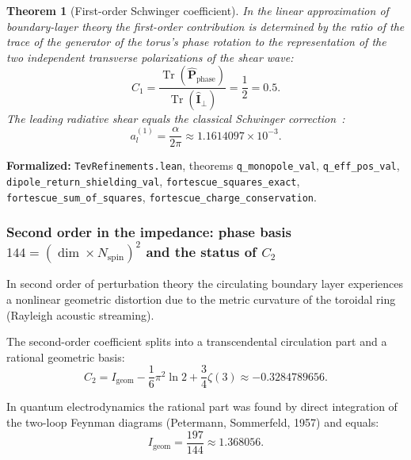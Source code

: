 \documentclass[11pt,a4paper]{article}
\newtheorem{theorem}{Theorem}
\theoremstyle{definition}
\theoremstyle{remark}
\begin{document}
\begin{theorem}[First-order Schwinger coefficient]
\label{thm:schwinger_first_order}
    In the linear approximation of boundary-layer theory the first-order contribution is determined by the ratio of the trace of the generator of the torus's phase rotation to the representation of the two independent transverse polarizations of the shear wave:
\begin{equation}
C_1 = \frac{\operatorname{Tr}(\hat{\mathbf{P}}_{\mathrm{phase}})}{\operatorname{Tr}(\hat{\mathbf{I}}_\perp)} = \frac{1}{2} = 0.5.
\label{eq:schwinger_c1_exact}
\end{equation}
The leading radiative shear equals the classical Schwinger correction~\cite{Schwinger1948}:
\begin{equation}
a_l^{(1)} = \frac{\alpha}{2\pi} \approx 1.1614097 \times 10^{-3}.
\label{eq:schwinger_leading_val}
\end{equation}
\end{theorem}

\noindent\small\textbf{Formalized:} \texttt{TevRefinements.lean}, theorems \texttt{q_monopole_val}, \texttt{q_eff_pos_val}, \texttt{dipole_return_shielding_val}, \texttt{fortescue_squares_exact}, \texttt{fortescue_sum_of_squares}, \texttt{fortescue_charge_conservation}.

\subsubsection{Second order in the impedance: phase basis $144 = (\dim \times N_{\mathrm{spin}})^2$ and the status of $C_2$}

In second order of perturbation theory the circulating boundary layer experiences a nonlinear geometric distortion due to the metric curvature of the toroidal ring (Rayleigh acoustic streaming).

The second-order coefficient splits into a transcendental circulation part and a rational geometric basis:
\begin{equation}
C_2 = I_{\mathrm{geom}} - \frac{1}{6} \pi^2 \ln 2 + \frac{3}{4} \zeta(3) \approx -0.3284789656.
\label{eq:c2_analytical_expansion}
\end{equation}

In quantum electrodynamics the rational part was found by direct integration of the two-loop Feynman diagrams (Petermann, Sommerfeld, 1957) and equals:
\begin{equation}
    I_{\mathrm{geom}} = \frac{197}{144} \approx 1.368056.
    \label{eq:I_geom_fraction_exact}
\end{equation}
\end{document}

